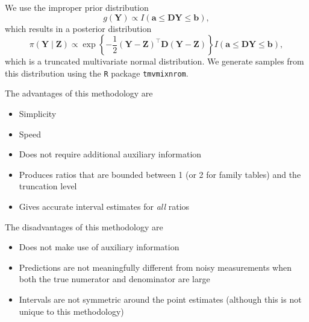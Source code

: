 \documentclass{article}
\begin{document}
We use the improper prior distribution
\begin{equation*}
  g ( \boldsymbol{Y} ) \propto I \left( \boldsymbol{a} \leq \boldsymbol{D}
    \boldsymbol{Y} \leq \boldsymbol{b} \right),
\end{equation*}
which results in a posterior distribution
\begin{equation*}
  \pi \left( \boldsymbol{Y} \mid \boldsymbol{Z} \right) \propto \exp \left\{
    -\frac{1}{2} \left( \boldsymbol{Y} - \boldsymbol{Z} \right)^\intercal
    \boldsymbol{D} \left( \boldsymbol{Y} - \boldsymbol{Z} \right) \right\} I
    \left( \boldsymbol{a} \leq \boldsymbol{D} \boldsymbol{Y} \leq \boldsymbol{b}
    \right),
\end{equation*}
which is a truncated multivariate normal distribution.  We generate samples from
this distribution using the {\tt R} package {\tt tmvmixnrom}.

The advantages of this methodology are
\begin{itemize}
  \item Simplicity
  \item Speed
  \item Does not require additional auxiliary information
  \item Produces ratios that are bounded between 1 (or 2 for family tables) and
    the truncation level
  \item Gives accurate interval estimates for {\em all} ratios
\end{itemize}

The disadvantages of this methodology are
\begin{itemize}
  \item Does not make use of auxiliary information
  \item Predictions are not meaningfully different from noisy measurements when
    both the true numerator and denominator are large
  \item Intervals are not symmetric around the point estimates (although this is
    not unique to this methodology)
\end{itemize}


\end{document}
